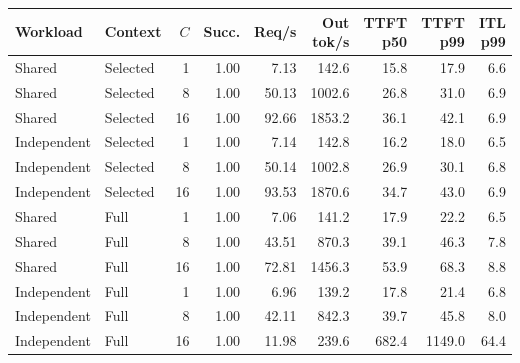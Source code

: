 \begin{tabular}{llrrrrrrr}
\toprule
Workload & Context & $C$ & Succ. & Req/s & Out tok/s & TTFT p50 & TTFT p99 & ITL p99 \\
\midrule
Shared & Selected & 1 & 1.00 & 7.13 & 142.6 & 15.8 & 17.9 & 6.6 \\
Shared & Selected & 8 & 1.00 & 50.13 & 1002.6 & 26.8 & 31.0 & 6.9 \\
Shared & Selected & 16 & 1.00 & 92.66 & 1853.2 & 36.1 & 42.1 & 6.9 \\
Independent & Selected & 1 & 1.00 & 7.14 & 142.8 & 16.2 & 18.0 & 6.5 \\
Independent & Selected & 8 & 1.00 & 50.14 & 1002.8 & 26.9 & 30.1 & 6.8 \\
Independent & Selected & 16 & 1.00 & 93.53 & 1870.6 & 34.7 & 43.0 & 6.9 \\
Shared & Full & 1 & 1.00 & 7.06 & 141.2 & 17.9 & 22.2 & 6.5 \\
Shared & Full & 8 & 1.00 & 43.51 & 870.3 & 39.1 & 46.3 & 7.8 \\
Shared & Full & 16 & 1.00 & 72.81 & 1456.3 & 53.9 & 68.3 & 8.8 \\
Independent & Full & 1 & 1.00 & 6.96 & 139.2 & 17.8 & 21.4 & 6.8 \\
Independent & Full & 8 & 1.00 & 42.11 & 842.3 & 39.7 & 45.8 & 8.0 \\
Independent & Full & 16 & 1.00 & 11.98 & 239.6 & 682.4 & 1149.0 & 64.4 \\
\bottomrule
\end{tabular}
